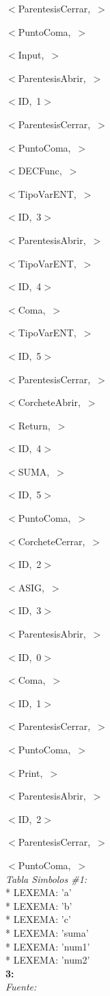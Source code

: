 \documentclass[a4paper, 12pt]{article}
\begin{document}
 
 \mbox{$<$ParentesisCerrar, $>$ }
 
 
 \mbox{$<$PuntoComa, $>$ }
 
 
 \mbox{$<$Input, $>$ }
 
 
 \mbox{$<$ParentesisAbrir, $>$ }
 
 
 \mbox{$<$ID, 1$>$ }
 
 
 \mbox{$<$ParentesisCerrar, $>$ }
 
 
 \mbox{$<$PuntoComa, $>$ }
 
 
 \mbox{$<$DECFunc, $>$ }
 
 
 \mbox{$<$TipoVarENT, $>$ }
 
 
 \mbox{$<$ID, 3$>$ }
 
 
 \mbox{$<$ParentesisAbrir, $>$ }
 
 
 \mbox{$<$TipoVarENT, $>$}
 
 
 \mbox{$<$ID, 4$>$ }
 
 
 \mbox{$<$Coma, $>$ }
 
 
 \mbox{$<$TipoVarENT, $>$ }
 
 
 \mbox{$<$ID, 5$>$ }
 
 
 \mbox{$<$ParentesisCerrar, $>$ }
 
 
 \mbox{$<$CorcheteAbrir, $>$ }
 
 
 \mbox{$<$Return, $>$ }
 
 
 \mbox{$<$ID, 4$>$ }
 
 
 \mbox{$<$SUMA, $>$ }
 
 
 \mbox{$<$ID, 5$>$ }
 
 
 \mbox{$<$PuntoComa, $>$ }
 
 
 \mbox{$<$CorcheteCerrar, $>$ }
 
 
 \mbox{$<$ID, 2$>$ }
 
 
 \mbox{$<$ASIG, $>$ }
 
 
 \mbox{$<$ID, 3$>$ }
 
 
 \mbox{$<$ParentesisAbrir, $>$ }
 
 
 \mbox{$<$ID, 0$>$ }
 
 
 \mbox{$<$Coma, $>$ }
 
 
 \mbox{$<$ID, 1$>$ }
 
 
 \mbox{$<$ParentesisCerrar, $>$ }
 
 
 \mbox{$<$PuntoComa, $>$ }
 
 
 \mbox{$<$Print, $>$ }
 
 
 \mbox{$<$ParentesisAbrir, $>$ }
 
 
 \mbox{$<$ID, 2$>$}
 
 
 \mbox{$<$ParentesisCerrar, $>$ }
 
 
 \mbox{$<$PuntoComa, $>$ }\medskip\\
\emph{Tabla Simbolos \#1:}\\ 
  \mbox{*} LEXEMA: 'a'\\
  \mbox{*} LEXEMA: 'b'\\
  \mbox{*} LEXEMA: 'c'\\
  \mbox{*} LEXEMA: 'suma'\\
  \mbox{*} LEXEMA: 'num1'\\
  \noindent
  \mbox{*} LEXEMA: 'num2'\bigskip\\
 \textbf{3:}\medskip \\
 \emph{Fuente:}
 
\end{document}
